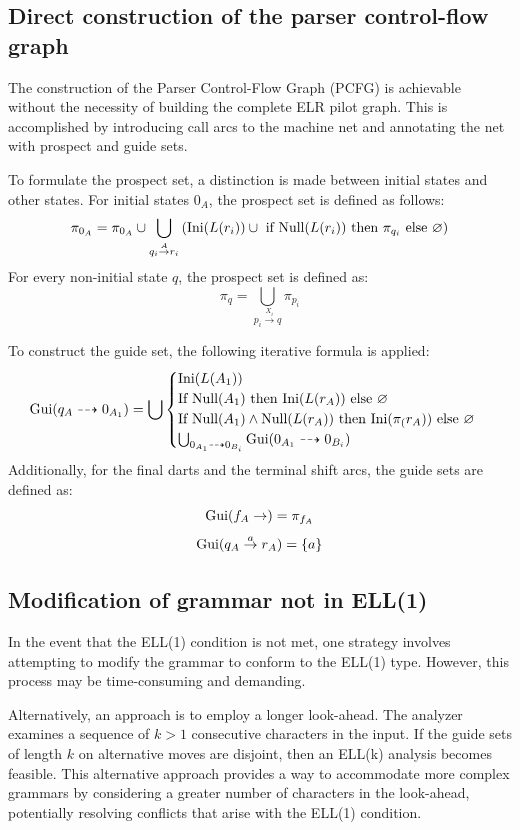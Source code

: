 \subsection{Direct construction of the parser control-flow graph}
The construction of the Parser Control-Flow Graph (PCFG) is achievable without the necessity of building the complete ELR pilot graph. 
This is accomplished by introducing call arcs to the machine net and annotating the net with prospect and guide sets.

To formulate the prospect set, a distinction is made between initial states and other states. 
For initial states $0_A$, the prospect set is defined as follows:
\[\pi_{0_A}=\pi_{0_A} \cup \bigcup_{q_i \overset{A}{\rightarrow} r_i}\left( \textnormal{Ini}(L(r_i)) \cup \textnormal{ if Null}(L(r_i)) \textnormal{ then } \pi_{q_i} \textnormal{ else } \varnothing \right)\]
For every non-initial state $q$, the prospect set is defined as:
\[\pi_q=\bigcup_{p_i \overset{X_i}{\rightarrow}q}\pi_{p_i}\]

To construct the guide set, the following iterative formula is applied:
\[\textnormal{Gui}(q_A \dashrightarrow 0_{A_1})=\bigcup
\begin{cases}
    \textnormal{Ini}(L(A_1)) \\
    \textnormal{If Null}(A_1) \textnormal{ then Ini}(L(r_A)) \textnormal{ else } \varnothing \\
    \textnormal{If Null}(A_1) \land \textnormal{Null}(L(r_A)) \textnormal{ then Ini}(\pi_(r_A)) \textnormal{ else } \varnothing \\
    \bigcup_{0_{A_1} \dashrightarrow 0_{B_i}}\textnormal{Gui}(0_{A_1} \dashrightarrow 0_{B_i})
\end{cases}\]
Additionally, for the final darts and the terminal shift arcs, the guide sets are defined as:
\[\textnormal{Gui}(f_A \rightarrow)=\pi_{f_A}\]
\[\textnormal{Gui}(q_A \overset{a}{\rightarrow}r_A)=\{a\}\]

\subsection{Modification of grammar not in ELL(1)}
In the event that the ELL(1) condition is not met, one strategy involves attempting to modify the grammar to conform to the ELL(1) type. 
However, this process may be time-consuming and demanding.

Alternatively, an approach is to employ a longer look-ahead. The analyzer examines a sequence of $k > 1$ consecutive characters in the input. 
If the guide sets of length $k$ on alternative moves are disjoint, then an ELL(k) analysis becomes feasible.
This alternative approach provides a way to accommodate more complex grammars by considering a greater number of characters in the look-ahead, potentially resolving conflicts that arise with the ELL(1) condition.